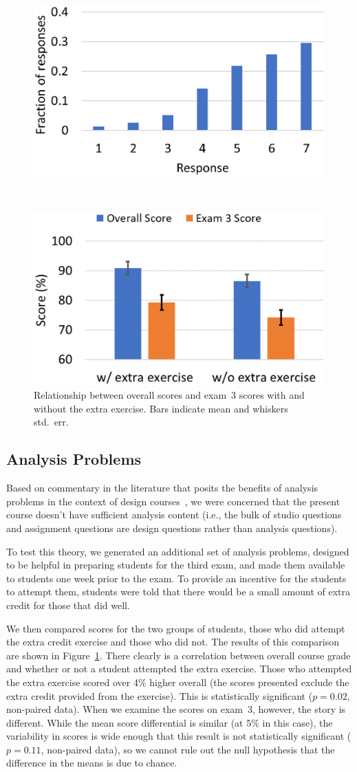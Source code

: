 \begin{figure}[t]
\centering
\parbox{0.48\columnwidth}{%
   \includegraphics[width=0.47\columnwidth]{pace}
   \caption{Student ratings of statement, ``The material was covered
at a reasonable pace''  (scoring: 1 - Strongly Disagree, 7 - Strongly Agree).}
   \label{fig:pace}
}
~
\parbox{0.48\columnwidth}{%
   \includegraphics[width=0.47\columnwidth]{scores}
   \caption{Relationship between overall scores and exam~3 scores
with and without the extra exercise. Bars indicate mean and
whiskers std.~err.}
   \label{fig:scores}
}
\end{figure}

\subsection{Analysis Problems}

Based on commentary in the literature that posits the benefits of
analysis problems in the context of design courses~\cite{wjbo01},
we were concerned that the present
course doesn't have sufficient analysis content (i.e., the bulk of
studio questions and assignment questions are design questions rather
than analysis questions).

To test this theory, we generated an additional set of analysis problems,
designed to be helpful in preparing students for the third exam, and
made them available to students one week prior to the exam.  To provide
an incentive for the students to attempt them, students were told that
there would be a small amount of extra credit for those that did well.

We then compared scores for the two groups of students, those who did
attempt the extra credit exercise and those who did not.  The results
of this comparison are shown in Figure~\ref{fig:scores}.
There clearly is a correlation between overall course grade and
whether or not a student attempted the extra exercise.
Those who attempted the extra exercise scored over 4\% higher overall
(the scores presented exclude the extra credit provided from the
exercise).  This is statistically significant ($p = 0.02$, non-paired data).
When we examine the scores on exam~3, however, the story is different.
While the mean score differential is similar (at 5\% in this case), the
variability in scores is wide enough that this result is not
statistically significant ($p = 0.11$, non-paired data), so we cannot
rule out the null hypothesis that the difference in the means is
due to chance.

